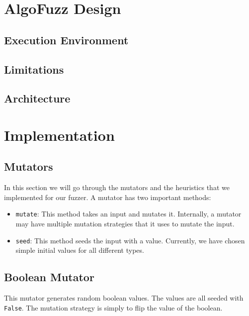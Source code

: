 \section{AlgoFuzz Design}

\subsection*{Execution Environment}

\subsection*{Limitations}

\subsection*{Architecture}

\section{Implementation}

\subsection*{Mutators} \label{section:mutators}
In this section we will go through the mutators and the heuristics that we implemented for our fuzzer.
A mutator has two important methods:
\begin{itemize}
    \item \texttt{mutate}: This method takes an input and mutates it.
          Internally, a mutator may have multiple mutation strategies that it uses to mutate the input.
    \item \texttt{seed}: This method seeds the input with a value.
          Currently, we have chosen simple initial values for all different types.
\end{itemize}

\subsection*{Boolean Mutator}
This mutator generates random boolean values. The values are all seeded with \texttt{False}.
The mutation strategy is simply to flip the value of the boolean.

